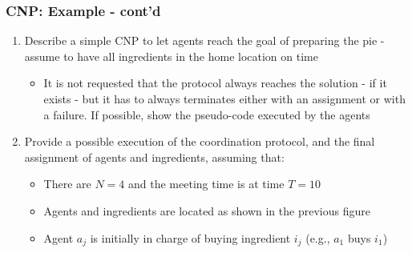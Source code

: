 \begin{frame}
	\frametitle{CNP: Example - cont'd}
	
	\Large 
	
	\begin{enumerate}
		\item Describe a simple CNP to let agents reach the goal of preparing the pie -
			  assume to have all ingredients in the home location on time
			  
			  \begin{itemize}
				  \item It is not requested that the protocol always reaches the solution -
						if it exists - but it has to always terminates either with an
						assignment or with a failure. If possible, show the pseudo-code
						executed by the agents
			  \end{itemize}
		
		\item Provide a possible execution of the coordination protocol, and the final
			  assignment of agents and ingredients, assuming that:
			  
			  \begin{itemize}
			  	  \item There are $ N = 4 $ and the meeting time is at time $ T = 10 $
			  	  
			  	  \item Agents and ingredients are located as shown in the previous figure
			  	  
			  	  \item Agent $ a_j $ is initially in charge of buying ingredient $ i_j $
						(e.g., $ a_1 $ buys $ i_1 $)
			  \end{itemize}
	\end{enumerate}
\end{frame}

